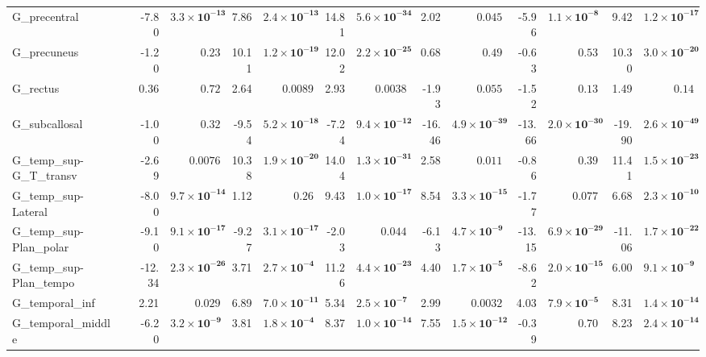 {\begin{longtable}{llrrrrrrrrrrrr}
G\_precentral &  & -7.80 & $\mathbf{3.3{\times}10^{-13}}$ & 7.86 & $\mathbf{2.4{\times}10^{-13}}$ & 14.81 & $\mathbf{5.6{\times}10^{-34}}$ & 2.02 & $0.045$ & -5.96 & $\mathbf{1.1{\times}10^{-8}}$ & 9.42 & $\mathbf{1.2{\times}10^{-17}}$ \\
G\_precuneus &  & -1.20 & $0.23$ & 10.11 & $\mathbf{1.2{\times}10^{-19}}$ & 12.02 & $\mathbf{2.2{\times}10^{-25}}$ & 0.68 & $0.49$ & -0.63 & $0.53$ & 10.30 & $\mathbf{3.0{\times}10^{-20}}$ \\
G\_rectus &  & 0.36 & $0.72$ & 2.64 & $0.0089$ & 2.93 & $0.0038$ & -1.93 & $0.055$ & -1.52 & $0.13$ & 1.49 & $0.14$ \\
G\_subcallosal &  & -1.00 & $0.32$ & -9.54 & $\mathbf{5.2{\times}10^{-18}}$ & -7.24 & $\mathbf{9.4{\times}10^{-12}}$ & -16.46 & $\mathbf{4.9{\times}10^{-39}}$ & -13.66 & $\mathbf{2.0{\times}10^{-30}}$ & -19.90 & $\mathbf{2.6{\times}10^{-49}}$ \\
G\_temp\_sup-G\_T\_transv &  & -2.69 & $0.0076$ & 10.38 & $\mathbf{1.9{\times}10^{-20}}$ & 14.04 & $\mathbf{1.3{\times}10^{-31}}$ & 2.58 & $0.011$ & -0.86 & $0.39$ & 11.41 & $\mathbf{1.5{\times}10^{-23}}$ \\
G\_temp\_sup-Lateral &  & -8.00 & $\mathbf{9.7{\times}10^{-14}}$ & 1.12 & $0.26$ & 9.43 & $\mathbf{1.0{\times}10^{-17}}$ & 8.54 & $\mathbf{3.3{\times}10^{-15}}$ & -1.77 & $0.077$ & 6.68 & $\mathbf{2.3{\times}10^{-10}}$ \\
G\_temp\_sup-Plan\_polar &  & -9.10 & $\mathbf{9.1{\times}10^{-17}}$ & -9.27 & $\mathbf{3.1{\times}10^{-17}}$ & -2.03 & $0.044$ & -6.13 & $\mathbf{4.7{\times}10^{-9}}$ & -13.15 & $\mathbf{6.9{\times}10^{-29}}$ & -11.06 & $\mathbf{1.7{\times}10^{-22}}$ \\
G\_temp\_sup-Plan\_tempo &  & -12.34 & $\mathbf{2.3{\times}10^{-26}}$ & 3.71 & $\mathbf{2.7{\times}10^{-4}}$ & 11.26 & $\mathbf{4.4{\times}10^{-23}}$ & 4.40 & $\mathbf{1.7{\times}10^{-5}}$ & -8.62 & $\mathbf{2.0{\times}10^{-15}}$ & 6.00 & $\mathbf{9.1{\times}10^{-9}}$ \\
G\_temporal\_inf &  & 2.21 & $0.029$ & 6.89 & $\mathbf{7.0{\times}10^{-11}}$ & 5.34 & $\mathbf{2.5{\times}10^{-7}}$ & 2.99 & $0.0032$ & 4.03 & $\mathbf{7.9{\times}10^{-5}}$ & 8.31 & $\mathbf{1.4{\times}10^{-14}}$ \\
G\_temporal\_middle &  & -6.20 & $\mathbf{3.2{\times}10^{-9}}$ & 3.81 & $\mathbf{1.8{\times}10^{-4}}$ & 8.37 & $\mathbf{1.0{\times}10^{-14}}$ & 7.55 & $\mathbf{1.5{\times}10^{-12}}$ & -0.39 & $0.70$ & 8.23 & $\mathbf{2.4{\times}10^{-14}}$ \\

\end{longtable}}
